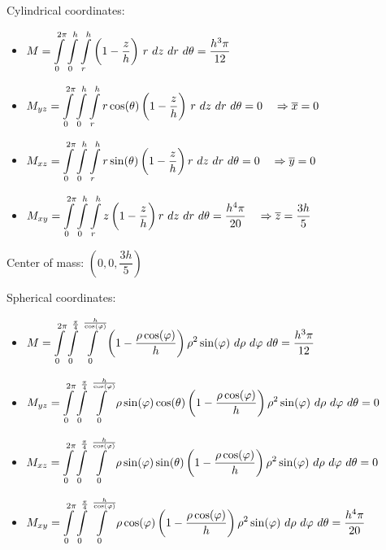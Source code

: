 \begin{Answer}
    
        \Question Cylindrical coordinates:
        \begin{itemize}
            \item $M = \displaystyle\int\limits_0^{2\pi}\int\limits_0^h\int\limits_r^h \left(1-\dfrac{z}{h}\right)\, r\ dz\ dr\ d\theta   = \dfrac{h^3\pi}{12}$
            \item $M_{yz} = \displaystyle\int\limits_0^{2\pi}\int\limits_0^h\int\limits_r^h r\cos(\theta)\left(1-\dfrac{z}{h}\right)\, r\ dz \ dr \ d\theta  = 0 \quad \Rightarrow \overline{x} = 0$ 
            \item $M_{xz} = \displaystyle\int\limits_0^{2\pi}\int\limits_0^h\int\limits_r^h r\sin(\theta)\left(1-\dfrac{z}{h}\right)r\ dz \ dr \ d\theta  = 0 \quad \Rightarrow \overline{y} = 0$ 
            \item $M_{xy} = \displaystyle\int\limits_0^{2\pi}\int\limits_0^h\int\limits_r^h z\left(1-\dfrac{z}{h}\right)r\ dz \ dr \ d\theta  = \dfrac{h^4\pi}{20} \quad  \Rightarrow \overline{z} = \dfrac{3h}{5}$ 
            \end{itemize}
            Center of mass: $\left(0,0,\dfrac{3h}{5}\right)$
            
         Spherical coordinates:
        \begin{itemize}
            \item $M = \displaystyle\int\limits_0^{2\pi}\int\limits_0^{\frac{\pi}{4}}\int\limits_0^{\frac{h}{\cos(\varphi)}} \left(1-\dfrac{\rho \cos(\varphi)}{h}\right)\rho^2 \sin(\varphi)\ d\rho \ d\varphi \ d\theta   = \dfrac{h^3\pi}{12}$
            \item $M_{yz} = \ds\int\limits_0^{2\pi}\int\limits_0^{\frac{\pi}{4}}\int\limits_0^{\frac{h}{\cos(\varphi)}} \rho \sin(\varphi)\cos(\theta) \left(1-\dfrac{\rho \cos(\varphi)}{h}\right)\rho^2 \sin(\varphi)\ d\rho \ d\varphi \ d\theta  = 0$ 
            \item $M_{xz} = \ds\int\limits_0^{2\pi}\int\limits_0^{\frac{\pi}{4}}\int\limits_0^{\frac{h}{\cos(\varphi)}} \rho \sin(\varphi)\sin(\theta) \left(1-\dfrac{\rho \cos(\varphi)}{h}\right)\rho^2 \sin(\varphi)\ d\rho \ d\varphi \ d\theta  = 0 $ 
            \item $M_{xy} = \displaystyle\int\limits_0^{2\pi}\int\limits_0^{\frac{\pi}{4}}\int\limits_0^{\frac{h}{\cos(\varphi)}} \rho \cos(\varphi)\left(1-\dfrac{\rho \cos(\varphi)}{h}\right)\rho^2 \sin(\varphi)\ d\rho \ d\varphi \ d\theta   = \dfrac{h^4\pi}{20}$ 
            \end{itemize}
    

\end{Answer}
